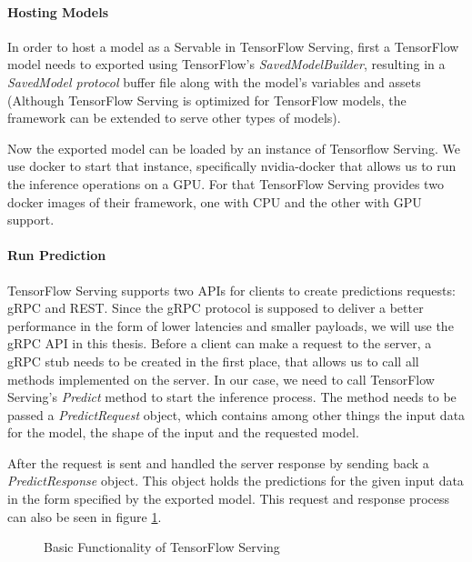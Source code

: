 \paragraph{Hosting Models}
In order to host a model as a Servable in TensorFlow Serving, first a TensorFlow model needs to exported using TensorFlow's \emph{SavedModelBuilder}, resulting in a \emph{SavedModel protocol} buffer file along with the model’s variables and assets (Although TensorFlow Serving is optimized for TensorFlow models, the framework can be extended to serve other types of models).

Now the exported model can be loaded by an instance of Tensorflow Serving.
We use docker to start that instance, specifically nvidia-docker that allows us to run the inference operations on a GPU. For that TensorFlow Serving provides two docker images of their framework, one with CPU and the other with GPU support.

\paragraph{Run Prediction}
TensorFlow Serving supports two APIs for clients to create predictions requests: gRPC and REST. Since the gRPC protocol is supposed to deliver a better performance in the form of lower latencies and smaller payloads, we will use the gRPC API in this thesis.
Before a client can make a request to the server, a gRPC stub needs to be created in the first place, that allows us to call all methods implemented on the server. In our case, we need to call TensorFlow Serving's \emph{Predict} method to start the inference process. The method needs to be passed a \emph{PredictRequest} object, which contains among other things the input data for the model, the shape of the input and the requested model.%

After the request is sent and handled the server response by sending back a \emph{PredictResponse} object. This object holds the predictions for the given input data in the form specified by the exported model.
This request and response process can also be seen in figure \ref{fig:cloud}.

\begin{figure}[H]
\centering

\caption{Basic Functionality of TensorFlow Serving}
\label{fig:cloud}
\end{figure}
 
